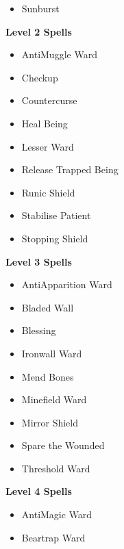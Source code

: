 \begin{multicols}{4}
\begin{itemize}[itemsep=0em]
\item Sunburst


\end{itemize}
\textbf{Level 2 Spells}
\begin{itemize}[itemsep=0em]
\renewcommand\labelitemi{-}
\item Anti\minus{}Muggle Ward

\item Checkup

\item Countercurse

\item Heal Being

\item Lesser Ward

\item Release Trapped Being

\item Runic Shield

\item Stabilise Patient

\item Stopping Shield


\end{itemize}
\textbf{Level 3 Spells}
\begin{itemize}[itemsep=0em]
\renewcommand\labelitemi{-}
\item Anti\minus{}Apparition Ward

\item Bladed Wall

\item Blessing

\item Ironwall Ward

\item Mend Bones

\item Minefield Ward

\item Mirror Shield

\item Spare the Wounded

\item Threshold Ward


\end{itemize}
\textbf{Level 4 Spells}
\begin{itemize}[itemsep=0em]
\renewcommand\labelitemi{-}
\item Anti\minus{}Magic Ward

\item Beartrap Ward


\end{itemize}
\end{multicols}
